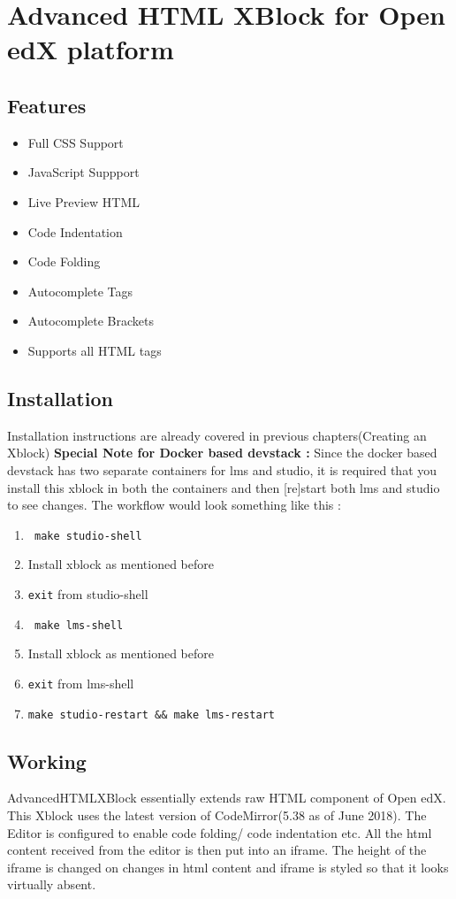 \chapter{Advanced HTML XBlock for Open edX platform}

\section{Features}
\begin{itemize}
	\item Full CSS Support
	\item JavaScript Suppport
	\item Live Preview HTML
	\item Code Indentation
	\item Code Folding
	\item Autocomplete Tags
	\item Autocomplete Brackets
	\item Supports all HTML tags
\end{itemize}

\section{Installation}
Installation instructions are already covered in previous chapters(Creating an Xblock)\newline
\textbf{Special Note for Docker based devstack :}\newline
Since the docker based devstack has two separate containers for lms and studio, it is required that you
install this xblock in both the containers and then [re]start both lms and studio to see changes.
The workflow would look something like this :
\begin{enumerate}
	\item \verb= make studio-shell=
	\item Install xblock as mentioned before
	\item \verb=exit= from studio-shell
	\item \verb= make lms-shell=
	\item Install xblock as mentioned before
	\item \verb=exit= from lms-shell
	\item \verb=make studio-restart && make lms-restart=
\end{enumerate}

\section{Working}
AdvancedHTMLXBlock essentially extends raw HTML component of Open edX. This Xblock uses
the latest version of CodeMirror(5.38 as of June 2018). The Editor is configured to enable code folding/
code indentation etc. All the html content received from the editor is then put into an iframe. The
height of the iframe is changed on changes in html content and iframe is styled so that it looks
virtually absent.

